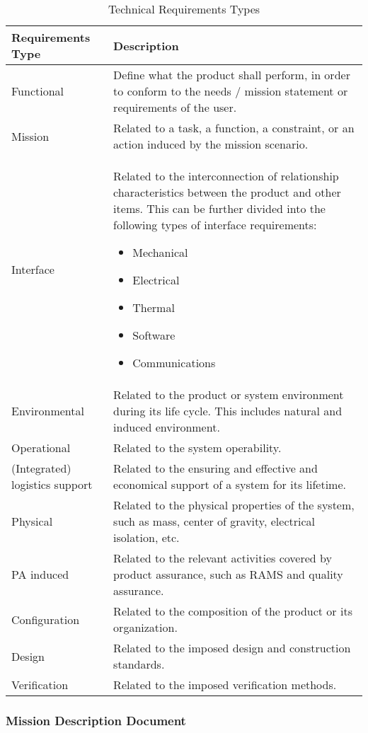 \begin{table}[h]
\centering
\begin{tabular}{l p{7cm}}
\toprule
\textbf{Requirements Type} & \textbf{Description} \\
\midrule
Functional  & Define what the product shall perform, in order to conform to the needs / mission statement or requirements of the user. \\ \hline
Mission  & Related to a task, a function, a constraint, or an action induced by the mission scenario. \\ \hline
Interface  & Related to the interconnection of relationship characteristics between the product and other items. This can be further divided into the following types of interface requirements: 
\begin{itemize}
\item Mechanical
\item Electrical
\item Thermal
\item Software
\item Communications
\end{itemize} \\ \hline
Environmental & Related to the product or system environment during its life cycle. This includes natural and induced environment. \\ \hline
Operational & Related to the system operability. \\ \hline
(Integrated) logistics support & Related to the ensuring and effective and economical support of a system for its lifetime. \\  \hline
Physical & Related to the physical properties of the system, such as mass, center of gravity, electrical isolation, etc. \\ \hline
PA induced & Related to the relevant activities covered by product assurance, such as RAMS and quality assurance. \\ \hline
Configuration & Related to the composition of the product or its organization. \\ \hline
Design & Related to the imposed design and construction standards. \\ \hline
Verification & Related to the imposed verification methods.\\ \hline
\bottomrule
\end{tabular}
\caption{Technical Requirements Types}
\end{table}

\clearpage
\subsubsection{Mission Description Document}
\label{app:Mission Description Document}

